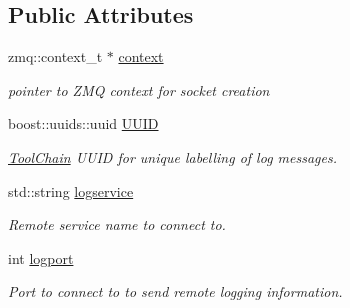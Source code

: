 \subsection*{Public Attributes}
\begin{DoxyCompactItemize}
\item 
\hypertarget{structLogging__thread__args_addacf7a55861c13832a75b88d74c006c}{zmq\-::context\-\_\-t $\ast$ \hyperlink{structLogging__thread__args_addacf7a55861c13832a75b88d74c006c}{context}}\label{structLogging__thread__args_addacf7a55861c13832a75b88d74c006c}

\begin{DoxyCompactList}\small\item\em pointer to Z\-M\-Q context for socket creation \end{DoxyCompactList}\item 
\hypertarget{structLogging__thread__args_a3a7c5617b7fa5214c6da407a23266d57}{boost\-::uuids\-::uuid \hyperlink{structLogging__thread__args_a3a7c5617b7fa5214c6da407a23266d57}{U\-U\-I\-D}}\label{structLogging__thread__args_a3a7c5617b7fa5214c6da407a23266d57}

\begin{DoxyCompactList}\small\item\em \hyperlink{classToolChain}{Tool\-Chain} U\-U\-I\-D for unique labelling of log messages. \end{DoxyCompactList}\item 
\hypertarget{structLogging__thread__args_a5a8e255209f5c171a7fbd78f0e308087}{std\-::string \hyperlink{structLogging__thread__args_a5a8e255209f5c171a7fbd78f0e308087}{logservice}}\label{structLogging__thread__args_a5a8e255209f5c171a7fbd78f0e308087}

\begin{DoxyCompactList}\small\item\em Remote service name to connect to. \end{DoxyCompactList}\item 
\hypertarget{structLogging__thread__args_ad5ab1c21e226a694c7f813bcb3ef9002}{int \hyperlink{structLogging__thread__args_ad5ab1c21e226a694c7f813bcb3ef9002}{logport}}\label{structLogging__thread__args_ad5ab1c21e226a694c7f813bcb3ef9002}

\begin{DoxyCompactList}\small\item\em Port to connect to to send remote logging information. \end{DoxyCompactList}\end{DoxyCompactItemize}


